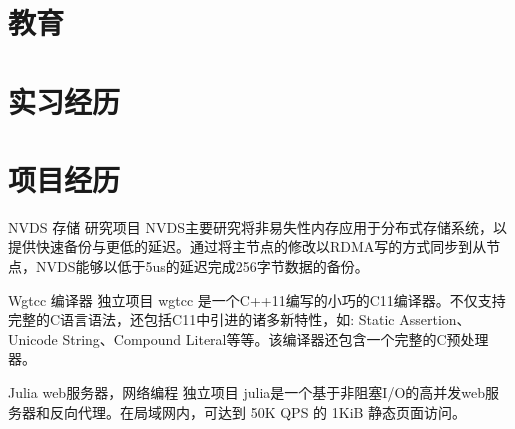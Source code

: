 \documentclass[11pt,a4paper]{moderncv}
\title{}               %
\begin{document}
\maketitle

\section{教育}

\section{实习经历}

\section{项目经历}
\renewcommand{\baselinestretch}{1.2}

{NVDS}
{存储}
{研究项目}{}
{NVDS主要研究将非易失性内存应用于分布式存储系统，以提供快速备份与更低的延迟。通过将主节点的修改以RDMA写的方式同步到从节点，NVDS能够以低于5us的延迟完成256字节数据的备份。}

{Wgtcc}
{编译器}
{独立项目}{}
{wgtcc 是一个C++11编写的小巧的C11编译器。不仅支持完整的C语言语法，还包括C11中引进的诸多新特性，如: Static Assertion、Unicode String、Compound Literal等等。该编译器还包含一个完整的C预处理器。}

\vspace*{0.2\baselineskip}
{Julia}
{web服务器，网络编程}
{独立项目}{}
{julia是一个基于非阻塞I/O的高并发web服务器和反向代理。在局域网内，可达到 50K QPS 的 1KiB 静态页面访问。}


\end{document}
